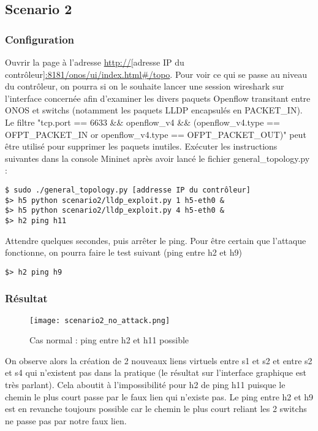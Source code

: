 \subsection{Scenario 2}

\subsubsection{Configuration}

Ouvrir la page à l'adresse \url{http://}[adresse IP du contrôleur]\url{:8181/onos/ui/index.html#/topo}.
Pour voir ce qui se passe au niveau du contrôleur, on pourra si on le souhaite lancer une session wireshark sur l'interface concernée afin d'examiner les divers paquets Openflow transitant entre ONOS et switchs (notamment les paquets LLDP encapsulés en PACKET\_IN). Le filtre "tcp.port == 6633 \&\& openflow\_v4 \&\& (openflow\_v4.type == OFPT\_PACKET\_IN or openflow\_v4.type == OFPT\_PACKET\_OUT)" peut être utilisé pour supprimer les paquets inutiles.
Exécuter les instructions suivantes dans la console Mininet après avoir lancé le fichier general\_topology.py :

\begin{verbatim}
$ sudo ./general_topology.py [addresse IP du contrôleur]
$> h5 python scenario2/lldp_exploit.py 1 h5-eth0 &
$> h5 python scenario2/lldp_exploit.py 4 h5-eth0 &
$> h2 ping h11
\end{verbatim}

Attendre quelques secondes, puis arrêter le ping. Pour être certain que l'attaque fonctionne, on pourra faire le test suivant (ping entre h2 et h9)

\begin{verbatim}
$> h2 ping h9
\end{verbatim}


\subsubsection{Résultat}

\begin{figure}[h]
  	\centering
  	\texttt{[image: scenario2\_no\_attack.png]}
  	\caption{Cas normal : ping entre h2 et h11 possible}
\end{figure}


On observe alors la création de 2 nouveaux liens virtuels entre s1 et s2 et entre s2 et s4 qui n'existent pas dans la pratique (le résultat sur l'interface graphique est très parlant). Cela aboutit à l'impossibilité pour h2 de ping h11 puisque le chemin le plus court passe par le faux lien qui n'existe pas. Le ping entre h2 et h9 est en revanche toujours possible car le chemin le plus court reliant les 2 switchs ne passe pas par notre faux lien.\\

